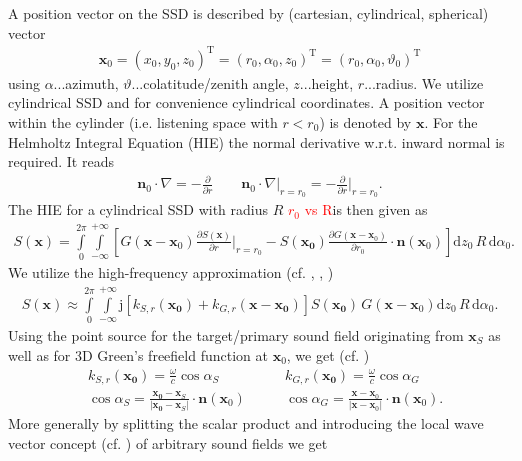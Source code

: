 \documentclass[a4paper,BCOR=15mm,10pt,twoside]{scrartcl}
\newcommand{\fscom}[2][red]{\textcolor{#1}{#2}}  %
\newcommand\im{\mathrm{j}}  %
\newcommand\fsd{\mathrm{d}}  %
\newcommand\wc{\frac{\omega}{c}}  %
\newcommand\azx{\alpha}  %
\newcommand\elx{\vartheta}  %
\renewcommand{\vec}[1]{\mathbf{#1}}  %
\newcommand\unitn{\vec{n}}  %
\newcommand{\norm}[1]{|#1|}  %
\begin{document}
A position vector on the SSD is described by (cartesian, cylindrical, spherical) vector
\begin{align}
\vec{x}_0 = (x_0,y_0,z_0)^\mathrm{T} = (r_0,\azx_0, z_0)^\mathrm{T} = (r_0,\azx_0, \elx_0)^\mathrm{T}
\end{align}
using $\azx$...azimuth, $\elx$...colatitude/zenith angle, $z$...height, $r$...radius.
We utilize cylindrical SSD and for convenience cylindrical coordinates.
A position vector within the cylinder (i.e. listening space with $r<r_0$) is denoted by $\vec{x}$.
%
For the Helmholtz Integral Equation (HIE) the normal derivative w.r.t. inward normal is required.
It reads
\begin{align}
\vec{n}_0 \cdot \nabla = -\frac{\partial}{\partial r} \qquad \vec{n}_0 \cdot \nabla\big|_{r=r_0} = -\frac{\partial}{\partial r}\bigg|_{r=r_0}.
\end{align}
%
The HIE for a cylindrical SSD with radius $R$ \fscom{$r_0$ vs R}is then given as
\begin{align}
S(\vec{x}) = \int\limits_{0}^{2\pi}\int\limits_{-\infty}^{+\infty}
\left[
G(\vec{x}-\vec{x}_0) \frac{\partial S(\vec{x})}{\partial r}\bigg|_{r=r_0} 
-S(\vec{x_0}) \frac{\partial G(\vec{x}-\vec{x}_0)}{\partial r_0}\cdot \unitn(\vec{x}_0)
\right]
\fsd z_0 \, R \, \fsd \azx_0.
\end{align}
%
We utilize the high-frequency approximation (cf. \cite[(57),(58)]{Firtha2018}, \cite[(3.42)]{Firtha2018Diss}, \cite[(2.36)]{Schultz2016Diss})
\begin{align}
\label{eq:HIE_FAR1}
S(\vec{x}) \approx \int\limits_{0}^{2\pi}\int\limits_{-\infty}^{+\infty}
\im 
\left[
k_{S,r}(\vec{x_0}) + k_{G,r}(\vec{x} - \vec{x_0})
\right]
S(\vec{x_0})\,G(\vec{x}-\vec{x}_0)
\fsd z_0 \, R \, \fsd \azx_0.
\end{align}
%
Using the point source for the target/primary sound field originating from $\vec{x}_S$ as well as for 3D Green's freefield function at $\vec{x}_0$, we get (cf. \cite[Sec. 2.2.1]{Schultz2016Diss})
\begin{align}
&k_{S,r}(\vec{x_0}) = \wc \cos\azx_S\qquad
&k_{G,r}(\vec{x_0}) = \wc \cos\azx_G\\
&\cos\azx_S = \frac{\vec{x_0}-\vec{x}_S}{|\vec{x_0}-\vec{x}_S|} \cdot \vec{n}(\vec{x}_0)\qquad
&\cos\azx_G = \frac{\vec{x}-\vec{x}_0}{\norm{\vec{x}-\vec{x}_0}} \cdot {\unitn(\vec{x}_0)}.
\end{align}
%
More generally by splitting the scalar product and introducing the local wave vector concept (cf. \cite[Sec. 3.1.1]{Firtha2018Diss}) of arbitrary sound fields we get
\end{document}
